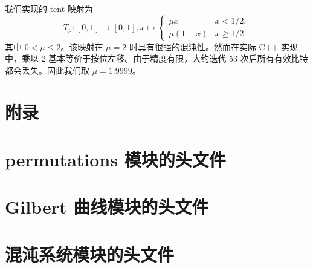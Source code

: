 \documentclass[12pt, a4paper, twoside]{article}
\begin{document}
我们实现的 tent 映射为
\begin{equation}
    T_\mu\colon [0, 1] \to [0, 1], x \mapsto 
    \begin{cases}
        \mu x & x < 1/2, \\
        \mu (1 - x) & x \geq 1/2
    \end{cases}
\end{equation}
其中 $0 < \mu \leq 2$。该映射在 $\mu = 2$ 时具有很强的混沌性。然而在实际 C++ 实现中，乘以 $2$ 基本等价于按位左移。由于精度有限，大约迭代 53 次后所有有效比特都会丢失。因此我们取 $\mu = 1.9999$。

\pagebreak

\appendix

\section*{附录}

\setcounter{figure}{0}
\renewcommand{\thefigure}{A\arabic{figure}}

\setcounter{table}{0}
\renewcommand{\thetable}{A\arabic{table}}

\section{permutations 模块的头文件}



\clearpage

\section{Gilbert 曲线模块的头文件}



\clearpage

\section{混沌系统模块的头文件}


\end{document}
